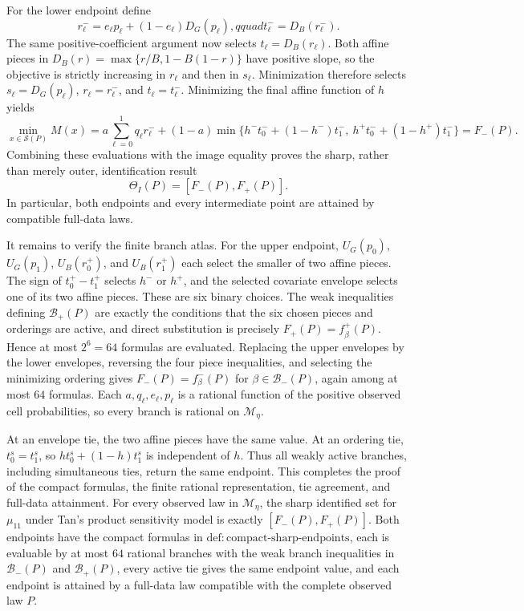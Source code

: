 For the lower endpoint define
\[
r_\ell^-=e_\ell p_\ell+(1-e_\ell)D_G(p_\ell),qquad
t_\ell^-=D_B(r_\ell^-).
\]
The same positive-coefficient argument now selects \(t_\ell=D_B(r_\ell)\). Both affine pieces in \(D_B(r)=\max\{r/B,1-B(1-r)\}\) have positive slope, so the objective is strictly increasing in \(r_\ell\) and then in \(s_\ell\). Minimization therefore selects \(s_\ell=D_G(p_\ell)\), \(r_\ell=r_\ell^-\), and \(t_\ell=t_\ell^-\). Minimizing the final affine function of \(h\) yields
\[
\min_{x\in\mathcal S(P)}M(x)
=a\sum_{\ell=0}^1q_\ell r_\ell^-
 +(1-a)\min\{h^-t_0^-+(1-h^-)t_1^-,\ h^+t_0^-+(1-h^+)t_1^-\}
=F_-(P).
\]
Combining these evaluations with the image equality proves the sharp, rather than merely outer, identification result
\[
\Theta_I(P)=[F_-(P),F_+(P)].
\]
In particular, both endpoints and every intermediate point are attained by compatible full-data laws.

It remains to verify the finite branch atlas. For the upper endpoint, \(U_G(p_0)\), \(U_G(p_1)\), \(U_B(r_0^+)\), and \(U_B(r_1^+)\) each select the smaller of two affine pieces. The sign of \(t_0^+-t_1^+\) selects \(h^-\) or \(h^+\), and the selected covariate envelope selects one of its two affine pieces. These are six binary choices. The weak inequalities defining \(\mathcal B_+(P)\) are exactly the conditions that the six chosen pieces and orderings are active, and direct substitution is precisely \(F_+(P)=f_\beta^+(P)\). Hence at most \(2^6=64\) formulas are evaluated. Replacing the upper envelopes by the lower envelopes, reversing the four piece inequalities, and selecting the minimizing ordering gives \(F_-(P)=f_\beta^-(P)\) for \(\beta\in\mathcal B_-(P)\), again among at most \(64\) formulas. Each \(a,q_\ell,e_\ell,p_\ell\) is a rational function of the positive observed cell probabilities, so every branch is rational on \(\mathcal M_\eta\).

At an envelope tie, the two affine pieces have the same value. At an ordering tie, \(t_0^s=t_1^s\), so \(h t_0^s+(1-h)t_1^s\) is independent of \(h\). Thus all weakly active branches, including simultaneous ties, return the same endpoint. This completes the proof of the compact formulas, the finite rational representation, tie agreement, and full-data attainment.
For every observed law in \(\mathcal M_\eta\), the sharp identified set for \(\mu_{11}\) under Tan's product sensitivity model is exactly \([F_-(P),F_+(P)]\). Both endpoints have the compact formulas in \(\mathrm{def{:}compact\text{-}sharp\text{-}endpoints}\), each is evaluable by at most \(64\) rational branches with the weak branch inequalities in \(\mathcal B_-(P)\) and \(\mathcal B_+(P)\), every active tie gives the same endpoint value, and each endpoint is attained by a full-data law compatible with the complete observed law \(P\).
